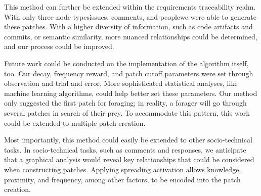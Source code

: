 \documentclass[conference]{IEEEtran}
\begin{document}
This method can further be extended within the requirements traceability realm. With only three node types\textemdash issues, comments, and people\textemdash we were able to generate these patches. With a higher diversity of information, such as code artifacts and commits, or semantic similarity, more nuanced relationships could be determined, and our process could be improved.

Future work could be conducted on the implementation of the algorithm itself, too. Our decay, frequency reward, and patch cutoff parameters were set through observation and trial and error. More sophisticated statistical analyses, like machine learning algorithms, could help better set these parameters. Our method only suggested the first patch for foraging; in reality, a forager will go through several patches in search of their prey. To accommodate this pattern, this work could be extended to multiple-patch creation. 

Most importantly, this method could easily be extended to other socio-technical tasks. In socio-technical tasks, such as comments and responses, we anticipate that a graphical analysis would reveal key relationships that could be considered when constructing patches. Applying spreading activation allows knowledge, proximity, and frequency, among other factors, to be encoded into the patch creation.




 
\end{document}
